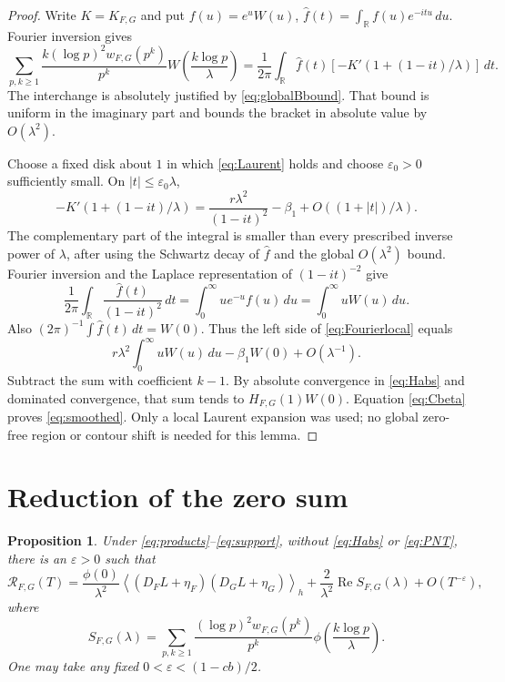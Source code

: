\documentclass[11pt]{article}
\numberwithin{equation}{section}
\newtheorem{proposition}[theorem]{Proposition}
\theoremstyle{remark}
\newcommand{\R}{\mathbb R}
\newcommand{\Rea}{\operatorname{Re}}
\newcommand{\av}[1]{\left\langle #1\right\rangle_h}
\begin{document}
\begin{proof}
Write $K=K_{F,G}$ and put $f(u)=e^uW(u)$,
$\widehat f(t)=\int_\R f(u)e^{-itu}\,du$. Fourier inversion gives
\begin{equation}\label{eq:Fourierlocal}
 \sum_{p,k\geq1}\frac{k(\log p)^2w_{F,G}(p^k)}{p^k}
 W\!\left(\frac{k\log p}{\lambda}\right)
 =\frac1{2\pi}\int_\R\widehat f(t)
       [-K'(1+(1-it)/\lambda)]\,dt.
\end{equation}
The interchange is absolutely justified by
\eqref{eq:globalBbound}. That bound is uniform in the imaginary part
and bounds the bracket in absolute value by $O(\lambda^2)$.

Choose a fixed disk about $1$ in which \eqref{eq:Laurent} holds and
choose $\varepsilon_0>0$ sufficiently small. On
$|t|\leq\varepsilon_0\lambda$,
\[
 -K'(1+(1-it)/\lambda)
 =\frac{r\lambda^2}{(1-it)^2}-\beta_1
       +O((1+|t|)/\lambda).
\]
The complementary part of the integral is smaller than every prescribed
inverse power of $\lambda$, after using the Schwartz decay of
$\widehat f$ and the global $O(\lambda^2)$ bound. Fourier inversion
and the Laplace representation of $(1-it)^{-2}$ give
\[
 \frac1{2\pi}\int_\R\frac{\widehat f(t)}{(1-it)^2}\,dt
 =\int_0^\infty u e^{-u}f(u)\,du
 =\int_0^\infty uW(u)\,du.
\]
Also $(2\pi)^{-1}\int\widehat f(t)\,dt=W(0)$. Thus the left side of
\eqref{eq:Fourierlocal} equals
\[
 r\lambda^2\int_0^\infty uW(u)\,du-\beta_1W(0)+O(\lambda^{-1}).
\]
Subtract the sum with coefficient $k-1$. By absolute convergence in
\eqref{eq:Habs} and dominated convergence, that sum tends to
$H_{F,G}(1)W(0)$. Equation \eqref{eq:Cbeta} proves
\eqref{eq:smoothed}. Only a local Laurent expansion was used; no
global zero-free region or contour shift is needed for this lemma.
\end{proof}

\section{Reduction of the zero sum}

\begin{proposition}\label{prop:reduction}
Under \eqref{eq:products}--\eqref{eq:support}, without
\eqref{eq:Habs} or \eqref{eq:PNT}, there is an $\varepsilon>0$ such that
\begin{equation}\label{eq:reduction}
 \mathcal R_{F,G}(T)=
 \frac{\phi(0)}{\lambda^2}
       \av{(D_FL+\eta_F)(D_GL+\eta_G)}
 +\frac2{\lambda^2}\Rea S_{F,G}(\lambda)+O(T^{-\varepsilon}),
\end{equation}
where
\begin{equation}\label{eq:S}
 S_{F,G}(\lambda)=\sum_{p,k\geq1}
       \frac{(\log p)^2w_{F,G}(p^k)}{p^k}
       \phi\!\left(\frac{k\log p}{\lambda}\right).
\end{equation}
One may take any fixed $0<\varepsilon<(1-cb)/2$.
\end{proposition}
\end{document}
